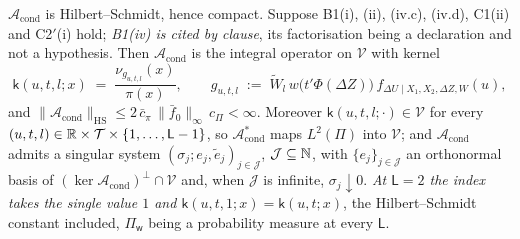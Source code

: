\begin{proposition}[Compactness]\label{prp:compact}
$\mathcal A_{\mathrm{cond}}$ is Hilbert--Schmidt, hence compact.
Suppose B1(i), (ii), (iv.c), (iv.d), C1(ii) and C2$'$(i) hold; \emph{B1(iv) is cited by clause}, its
factorisation being a declaration and not a hypothesis.
Then $\mathcal A_{\mathrm{cond}}$ is the integral
operator on $\mathcal V$ with kernel
\begin{equation}\label{eq:kernel}
\mathsf k(u,t,l;x)\;=\;\frac{\nu_{g_{u,t,l}}(x)}{\pi(x)},
\qquad
g_{u,t,l}\;:=\;\widetilde W_l\,w\big(t'\Phi(\Delta Z)\big)\,f_{\Delta U\mid X_1,X_2,\Delta Z,W}(u),
\end{equation}
and $\|\mathcal A_{\mathrm{cond}}\|_{\mathrm{HS}}\le 2\,\bar c_\pi\,\|\bar f_0\|_\infty\,c_\Pi<\infty$.
Moreover $\mathsf k(u,t,l;\cdot)\in\mathcal V$ for every
$(u,t,l)\in\mathbb{R}\times\mathcal T\times\{1,\dots,\mathsf L-1\}$, so $\mathcal A^\ast_{\mathrm{cond}}$ maps
$L^{2}(\Pi)$ into $\mathcal V$; and $\mathcal A_{\mathrm{cond}}$ admits a singular system
$(\sigma_j;e_j,\tilde e_j)_{j\in\mathcal J}$, $\mathcal J\subseteq\mathbb{N}$, with $\{e_j\}_{j\in\mathcal J}$
an orthonormal basis of $(\ker\mathcal A_{\mathrm{cond}})^{\perp}\cap\mathcal V$ and, when $\mathcal J$ is
infinite, $\sigma_j\downarrow0$.
\emph{At $\mathsf L=2$ the index takes the single value $1$ and $\mathsf k(u,t,1;x)=\mathsf k(u,t;x)$},
the Hilbert--Schmidt constant included, $\Pi_{\mathsf w}$ being a probability measure at every
$\mathsf L$.
\end{proposition}

